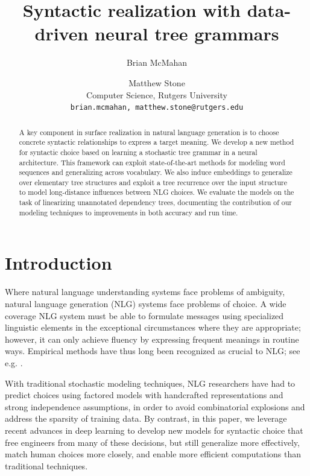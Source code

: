 \documentclass[11pt]{article}
\title{Syntactic realization with data-driven neural tree grammars}
\author{Brian McMahan \and Matthew Stone \\
   Computer Science, Rutgers University \\
   {\tt brian.mcmahan, matthew.stone@rutgers.edu}}
\date{}
\begin{document}
\maketitle
\begin{abstract}

A key component in surface realization in natural language generation
is to choose concrete syntactic relationships to express a target
meaning.
%
We develop a new method for syntactic choice based on learning a
stochastic tree grammar in a neural architecture.
%
This framework can exploit state-of-the-art methods for modeling word
sequences and generalizing across vocabulary.
%
We also induce embeddings to generalize over elementary tree
structures and exploit a tree recurrence over the input structure to
model long-distance influences between NLG choices.
%
We evaluate the models on the task of linearizing unannotated
dependency trees, documenting the contribution of our modeling
techniques to improvements in both accuracy and run time.

\end{abstract}

\section{Introduction}

Where natural language understanding systems face problems of
ambiguity, natural language generation (NLG) systems face problems of
choice. A wide coverage NLG system must be able to formulate messages
using specialized linguistic elements in the exceptional circumstances
where they are appropriate; however, it can only achieve fluency by
expressing frequent meanings in routine ways. Empirical methods have
thus long been recognized as crucial to NLG; see
e.g. .

With traditional stochastic modeling techniques, NLG researchers have
had to predict choices using factored models with handcrafted
representations and strong independence assumptions, in order to avoid
combinatorial explosions and address the sparsity of training data.
%
By contrast, in this paper, we leverage recent advances in deep
learning to develop new models for syntactic choice that free
engineers from many of these decisions, but still generalize more
effectively, match human choices more closely, and enable more
efficient computations than traditional techniques.
\end{document}
